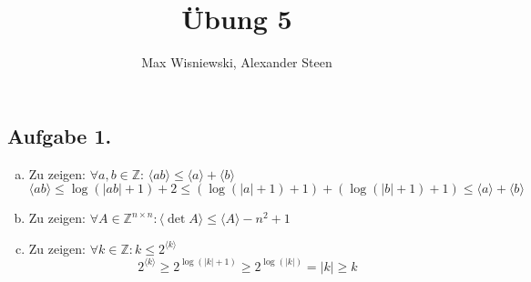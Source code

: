 \documentclass[11pt,a4paper,ngerman]{article}
\date{}
\title{Übung 5}
\author{Max Wisniewski, Alexander Steen}
\newcommand{\code}[1]{\langle {#1} \rangle}
\newcommand{\Z}{\mathbb{Z}}
\begin{document}

\renewcommand{\figurename}{Figure}

\maketitle
\thispagestyle{fancy}

\subsection*{Aufgabe 1.}
\begin{enumerate}[a)]
\item Zu zeigen: $\forall a,b \in \Z: \, \code{ab} \leq \code{a} + \code{b}$ 
\begin{equation*}
 \code{ab} \leq \log(|ab| + 1)+2 \leq (\log(|a|+1)+1) + (\log(|b|+1)+1) \leq \code{a} + \code{b}
\end{equation*}
\item Zu zeigen: $\forall A \in \Z^{n \times n}: \code{\det A} \leq \code{A} - n^2 + 1$ \\
\item Zu zeigen: $\forall k \in \Z: k \leq 2^{\code{k}}$ \\
\begin{equation*}
2^{\code{k}} \geq 2^{\log(|k| + 1)} \geq 2^{\log(|k|)} = |k| \geq k
\end{equation*}
\end{enumerate}
\end{document}

